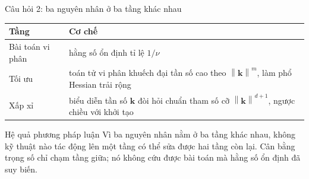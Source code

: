 \documentclass[aspectratio=169,11pt]{beamer}
\newcommand{\bk}{\bm{k}}
\newcommand{\norm}[1]{\left\lVert #1 \right\rVert}
\begin{document}
\begin{frame}{Câu hỏi 2: ba nguyên nhân ở ba tầng khác nhau}
\small
\begin{table}
\small
\begin{tabular}{@{}lp{7.6cm}@{}}
\toprule
\textbf{Tầng} & \textbf{Cơ chế} \\
\midrule
Bài toán vi phân & hằng số ổn định tỉ lệ $1/\nu$ \\[2pt]
Tối ưu & toán tử vi phân khuếch đại tần số cao theo $\norm{\bk}^m$,
  làm phổ Hessian trải rộng \\[2pt]
Xấp xỉ & biểu diễn tần số $\bk$ đòi hỏi chuẩn tham số cỡ $\norm{\bk}^{d+1}$,
  ngược chiều với khởi tạo \\
\bottomrule
\end{tabular}
\end{table}

\medskip
\begin{alertblock}{Hệ quả phương pháp luận}
Vì ba nguyên nhân nằm ở ba tầng khác nhau,
\alert{không kỹ thuật nào tác động lên một tầng có thể sửa được hai tầng còn lại.}
Cân bằng trọng số chỉ chạm tầng giữa; nó không cứu được bài toán mà hằng số
ổn định đã suy biến.
\end{alertblock}
\end{frame}
\end{document}
